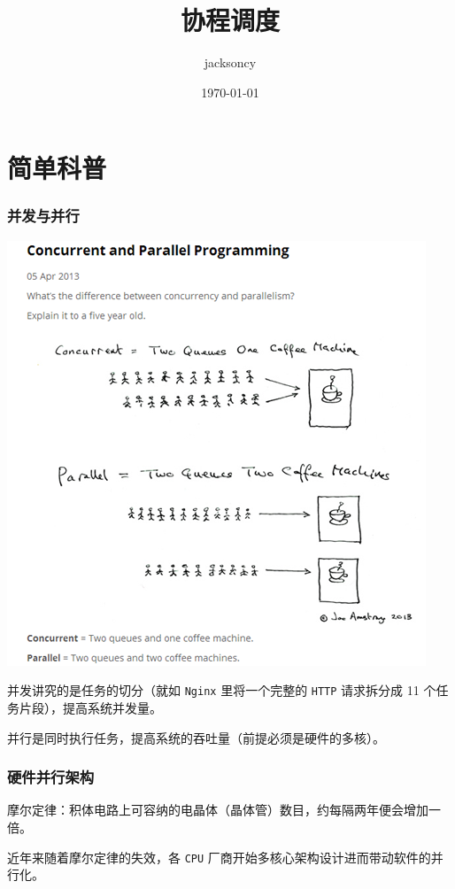 \documentclass[UTF8]{ctexart}
\author{jacksoncy}
\date{\today}
\title{协程调度}
\begin{document}
\maketitle
\tableofcontents


\section{简单科普}
\label{sec:orgd3959ca}
\subsubsection{并发与并行}
\label{sec:org44588fa}
\begin{center}
\includegraphics[width=.9\linewidth]{./parallelism.png}
\end{center}

并发讲究的是任务的切分（就如 \texttt{Nginx} 里将一个完整的 \texttt{HTTP} 请求拆分成 11 个任务片段），提高系统并发量。

并行是同时执行任务，提高系统的吞吐量（前提必须是硬件的多核）。
\subsubsection{硬件并行架构}
\label{sec:org4a77e3c}
摩尔定律：积体电路上可容纳的电晶体（晶体管）数目，约每隔两年便会增加一倍。

近年来随着摩尔定律的失效，各 \texttt{CPU} 厂商开始多核心架构设计进而带动软件的并行化。
\end{document}
